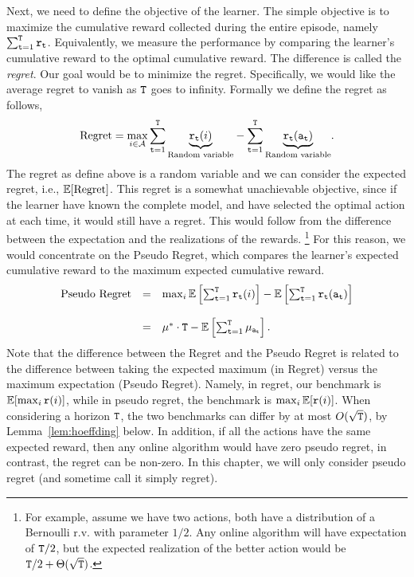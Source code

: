 Next, we need to define the objective of the learner. The simple objective is to maximize the cumulative reward collected during the entire episode, namely $\sum_{{\tt t}=1}^{\tt T} {\tt r}_{\tt t}$. Equivalently, we measure the performance by comparing the learner's cumulative reward to the optimal cumulative reward. The difference is called the \emph{regret}. Our goal would be to minimize the regret. Specifically, we would like the average regret to vanish as ${\tt T}$ goes to infinity.
Formally we define the regret as follows,
\[
\text{Regret}=\max_{i\in \mathcal{A}}{\displaystyle
\sum_{{\tt t}=1}^{{\tt T}}\underbrace{{\tt r}_{{\tt t}}(i)}_{\text{Random variable}}}-{\displaystyle
\sum_{{\tt t}=1}^{{\tt T}}\underbrace{{\tt r}_{{\tt t}}({\tt a}_{{\tt t}})}_{\text{Random variable}}}.
\]
The regret as define above is a random variable and we can consider the expected regret, i.e., $\mathbb{E}[\text{Regret}]$. This regret is a somewhat unachievable objective, since if the learner have known the complete model, and  have selected the optimal action at each time, it would still have a regret. This would follow from the difference between the expectation and the realizations of the rewards. \footnote{For example, assume we have two actions, both have a distribution of a Bernoulli r.v. with parameter $1/2$. Any online algorithm will have expectation of ${\tt T}/2$, but the expected realization of the better action would be ${\tt T}/2+\Theta(\sqrt{{\tt T}})$.}
For this reason, we would concentrate on the Pseudo Regret, which compares the learner's expected cumulative reward to the maximum expected cumulative reward. 
\[
\begin{array}{ccl}
\text{Pseudo Regret} & = & \max_{i}\mathbb{E}\left[ \sum_{{\tt t}= 1}^{{\tt T}}{\tt r}_{{\tt t}}(i)\right]-\mathbb{E}\left[ \sum_{{\tt t}=1}^{{\tt T}}{\tt r}_{{\tt t}}({\tt a}_{{\tt t}})\right]\\
\\
 & = & \mu^{*}\cdot {\tt T}- \mathbb{E}\left[\sum_{{\tt t}=1}^{{\tt T}}\mu_{{\tt a}_{{\tt t}}}\right].
\end{array}
\]
Note that the difference between the Regret and the Pseudo Regret is related to the difference between taking the expected maximum (in Regret) versus the maximum expectation (Pseudo Regret). Namely, in regret, our benchmark is $\mathbb{E}[\max_i {\tt r}(i)]$, while in pseudo regret, the benchmark is $\max_i \mathbb{E}[{\tt r}(i)]$. When considering a horizon ${\tt T}$, the two benchmarks can differ by at most $O(\sqrt{{\tt T}})$, by Lemma~\ref{lem:hoeffding} below.
%
In addition, if all the actions have the same expected reward, then any online algorithm would have zero pseudo regret, in contrast, the regret can be non-zero.
%
In this chapter, we will only consider pseudo regret (and sometime call it simply regret). 

